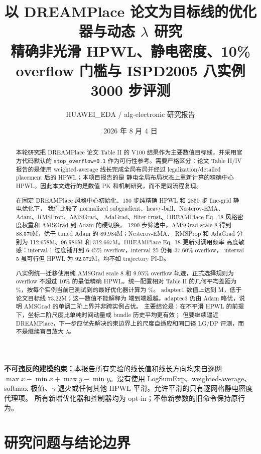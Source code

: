 \documentclass[UTF8,fontset=windows,a4paper,11pt]{ctexart}
\title{\textbf{以 DREAMPlace 论文为目标线的优化器与动态 $\lambda$ 研究}\\
\large 精确非光滑 HPWL、静电密度、10\% overflow 门槛与 ISPD2005 八实例 3000 步评测}
\author{HUAWEI\_EDA / alg-electronic 研究报告}
\date{2026 年 8 月 4 日}
\newcommand{\code}[1]{\texttt{#1}}
\begin{document}
\maketitle

\begin{center}
\colorbox{soft}{\parbox{0.93\textwidth}{
\textbf{不可违反的建模约束：}本报告所有实验的线长值和线长方向均来自逐网
$\max x-\min x+\max y-\min y$。没有使用 LogSumExp、weighted-average、
softmax 极值、$\gamma$ 退火或任何其他 HPWL 平滑。允许平滑的只有逐网格静电密度代理项。
所有新增优化器和控制器均为 opt-in；不带新参数的旧命令保持原行为。
}}
\end{center}

\begin{abstract}
本轮研究把 DREAMPlace 论文 Table II 的 V100 结果作为主要数值目标线，并采用官方代码默认的
\code{stop\_overflow=0.1} 作为可行性参考。需要严格区分：论文 Table II/IV 报告的是使用
weighted-average 线长完成全局布局并经过 legalization/detailed placement 后的 HPWL；本项目报告的是
静电全局布局状态上重新计算的精确中心 HPWL。因此本文进行的是数值 PK 和机制研究，而不是同流程复现。

在固定 DREAMPlace 风格中心初始化、150 步纯精确 HPWL 和 2850 步 fine-grid 静电优化下，
我们比较了 normalized subgradient、heavy-ball、Nesterov-EMA、Adam、RMSProp、AMSGrad、
AdaGrad、filter-trust、DREAMPlace Eq.~18 风格密度权重和 AMSGrad 到 Adam 的硬切换。
1200 步筛选中，AMSGrad scale 8 得到 88.570M，优于 tuned Adam 的 89.984M；Nesterov-EMA、
RMSProp 和 AdaGrad 分别为 112.658M、96.986M 和 312.667M。DREAMPlace Eq.~18 更新对调用频率
高度敏感：interval 1 过度铺开到 6.45\% overflow，interval 25 仍有 37.60\% overflow，
interval 5 虽可行但 HPWL 为 92.572M，均不如 trajectory PI-D。

八实例统一迁移使用纯 AMSGrad scale 8 和 9.95\% overflow 轨迹，正式选择规则为
overflow 不超过 10\% 的最低精确 HPWL。统一配置相对 Table II 的几何平均差距为
\UnifiedGeomeanGap\%，按每个实例当前已测试到的最好优化器计算为 \BestGeomeanGap\%。
adaptec1 数值上达到 \UnifiedAdaptecOneHPWL M，低于论文目标线 73.22M；这一数值不能解释为
端到端超越。adaptec3 仍由 Adam 略优，说明 AMSGrad 的单调二阶上界并非跨实例占优。
主要结论是：在不平滑 HPWL 的前提下，坐标二阶尺度比单纯时间动量或 bundle 历史平均更有效；
但要继续逼近 DREAMPlace，下一步应优先解决约束边界上的尺度自适应和同口径 LG/DP 评测，而不是继续盲目放大 $\lambda$。
\end{abstract}

\tableofcontents
\newpage

\section{研究问题与结论边界}
\end{document}

